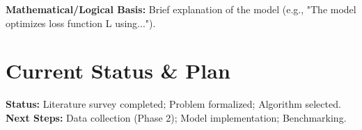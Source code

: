 \documentclass[11pt, a4paper]{article}
\begin{document}
\textbf{Mathematical/Logical Basis:} Brief explanation of the model (e.g., "The model optimizes loss function L using...").

\section{Current Status \& Plan}
\textbf{Status:} Literature survey completed; Problem formalized; Algorithm selected. \\
\textbf{Next Steps:} Data collection (Phase 2); Model implementation; Benchmarking.

\vspace{0.2cm}
\renewcommand{\refname}{\normalsize References}

\end{document}

